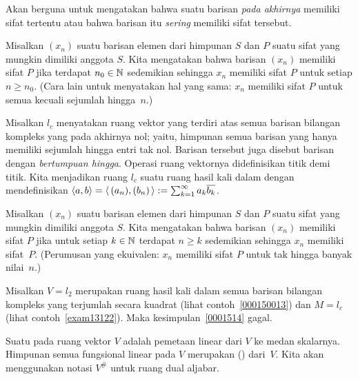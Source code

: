 Akan berguna untuk mengatakan bahwa suatu barisan \emph{pada akhirnya} memiliki sifat tertentu atau
bahwa barisan itu \emph{sering} memiliki sifat tersebut.

\begin{defn}\label{C013121} Misalkan $(x_n)$ suatu barisan elemen dari himpunan $S$ dan $P$ suatu
sifat yang mungkin dimiliki anggota $S$. Kita mengatakan bahwa barisan $(x_n)$
 memiliki sifat $P$ jika terdapat $n_0 \in \mathbb{N}$ sedemikian sehingga $x_n$ memiliki
sifat $P$ untuk setiap $n \ge n_0$. (Cara lain untuk menyatakan hal yang sama: $x_n$ memiliki
sifat $P$ untuk semua kecuali sejumlah hingga~$n$.)
\end{defn}

\begin{exam}\label{exam13122} Misalkan $l_c$ menyatakan
ruang vektor yang terdiri atas semua barisan bilangan kompleks yang pada akhirnya nol;
yaitu, himpunan semua barisan yang hanya memiliki sejumlah hingga entri tak nol. Barisan tersebut juga disebut barisan dengan
\emph{bertumpuan hingga}. Operasi ruang vektornya didefinisikan titik demi titik. Kita menjadikan ruang $l_c$ suatu
ruang hasil kali dalam dengan
mendefinisikan $\langle a,b \rangle = \langle\, (a_n),(b_n)\, \rangle := \sum_{k=1}^\infty a_k \overline{b_k}$.
\end{exam}

\begin{defn}\label{C013131} Misalkan $(x_n)$ suatu barisan elemen dari himpunan $S$ dan $P$ suatu
sifat yang mungkin dimiliki anggota $S$. Kita mengatakan bahwa barisan $(x_n)$
 memiliki sifat $P$ jika untuk setiap $k \in \mathbb{N}$ terdapat $n \ge k$ sedemikian sehingga
$x_n$ memiliki sifat~$P$. (Perumusan yang ekuivalen: $x_n$ memiliki sifat $P$ untuk tak hingga banyak
nilai~$n$.)
\end{defn}

\begin{exam}\label{exam13132} Misalkan $V = l_2$ merupakan ruang hasil kali dalam semua barisan bilangan kompleks
yang terjumlah secara kuadrat (lihat contoh~\ref{000150013}) dan $M = l_c$ (lihat contoh~\ref{exam13122}). Maka kesimpulan~\ref{0001514} gagal.
\end{exam}

\begin{defn}\label{def_alg_dual} Suatu
 pada ruang vektor $V$ adalah pemetaan linear dari $V$ ke medan
skalarnya. Himpunan semua fungsional linear pada $V$ merupakan
 () dari~$V$. Kita akan menggunakan
notasi $V^{\#}$ untuk ruang dual aljabar.
\end{defn}

